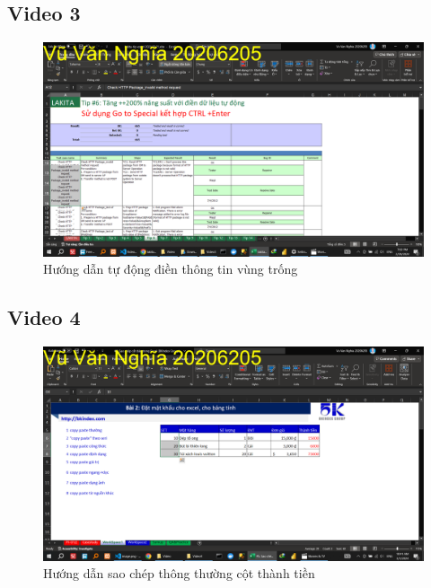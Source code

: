 \documentclass{article}
\begin{document}
\subsection{Video 3}
\begin{figure}[H]
\centering
\includegraphics[scale = 0.15]{Video3/HuongDan/1.png}
\caption{Hướng dẫn tự động điền thông tin vùng trống}
\end{figure}
\subsection{Video 4}
\begin{figure}[H]
\centering
\includegraphics[scale = 0.15]{Video4/HuongDan/1.png}
\caption{Hướng dẫn sao chép thông thường cột thành tiền}
\end{figure}
\end{document}
